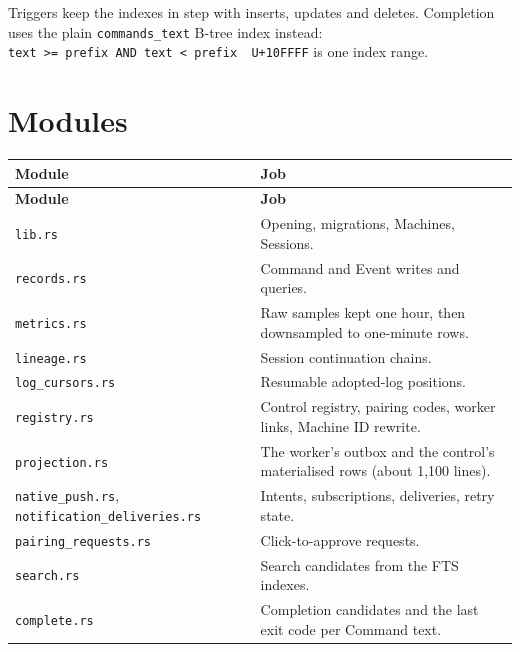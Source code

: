 Triggers keep the indexes in step with inserts, updates and deletes. Completion uses the plain \texttt{commands\_\allowbreak{}text} B-tree index instead: \texttt{text\ \textgreater{}=\allowbreak{}\ prefix\ AND\ text\ \textless{}\ prefix\ \textbar{}\textbar{}\ U+10FFFF} is one index range.

\section{\texorpdfstring{Modules}{Modules}}

\begin{small}
\begin{longtable}{>{\raggedright\arraybackslash}p{0.401\dimexpr \linewidth-4\tabcolsep\relax}>{\raggedright\arraybackslash}p{0.599\dimexpr \linewidth-4\tabcolsep\relax}}
\toprule
\textbf{Module} & \textbf{Job} \\
\midrule
\endfirsthead
\toprule
\textbf{Module} & \textbf{Job} \\
\midrule
\endhead
\texttt{lib.\allowbreak{}rs} & Opening, migrations, Machines, Sessions. \\
\texttt{records.\allowbreak{}rs} & Command and Event writes and queries. \\
\texttt{metrics.\allowbreak{}rs} & Raw samples kept one hour, then downsampled to one-minute rows. \\
\texttt{lineage.\allowbreak{}rs} & Session continuation chains. \\
\texttt{log\_\allowbreak{}cursors.\allowbreak{}rs} & Resumable adopted-log positions. \\
\texttt{registry.\allowbreak{}rs} & Control registry, pairing codes, worker links, Machine ID rewrite. \\
\texttt{projection.\allowbreak{}rs} & The worker's outbox and the control's materialised rows (about 1,100 lines). \\
\texttt{native\_\allowbreak{}push.\allowbreak{}rs}, \texttt{notification\_\allowbreak{}deliveries.\allowbreak{}rs} & Intents, subscriptions, deliveries, retry state. \\
\texttt{pairing\_\allowbreak{}requests.\allowbreak{}rs} & Click-to-approve requests. \\
\texttt{search.\allowbreak{}rs} & Search candidates from the FTS indexes. \\
\texttt{complete.\allowbreak{}rs} & Completion candidates and the last exit code per Command text. \\
\bottomrule
\end{longtable}
\end{small}

